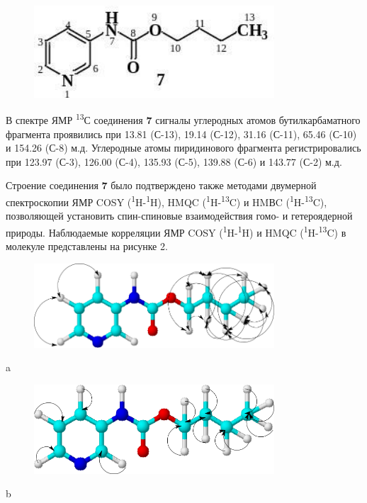 \begin{figure}[H]
	\centering
	\includegraphics[width=0.8\textwidth]{assets/6}
	\caption*{}
\end{figure}

В спектре ЯМР \textsuperscript{13}С соединения {\bfseries 7} сигналы
углеродных атомов бутилкарбаматного фрагмента проявились при 13.81
(С-13), 19.14 (С-12), 31.16 (С-11), 65.46 (С-10) и 154.26 (С-8) м.д.
Углеродные атомы пиридинового фрагмента регистрировались при 123.97
(С-3), 126.00 (С-4), 135.93 (С-5), 139.88 (С-6) и 143.77 (С-2) м.д.

Строение соединения {\bfseries 7} было подтверждено также методами
двумерной спектроскопии ЯМР COSY
(\textsuperscript{1}H-\textsuperscript{1}H), HMQC
(\textsuperscript{1}H-\textsuperscript{13}C) и HMВC
(\textsuperscript{1}H-\textsuperscript{13}C), позволяющей установить
спин-спиновые взаимодействия гомо- и гетероядерной природы. Наблюдаемые
корреляции ЯМР COSY (\textsuperscript{1}H-\textsuperscript{1}H) и HMQC
(\textsuperscript{1}H-\textsuperscript{13}C) в молекуле представлены на
рисунке 2.

\begin{figure}[H]
	\centering
	\includegraphics[width=0.8\textwidth]{assets/7}
	\caption*{}
\end{figure}a

\begin{figure}[H]
	\centering
	\includegraphics[width=0.8\textwidth]{assets/8}
	\caption*{}
\end{figure}b

